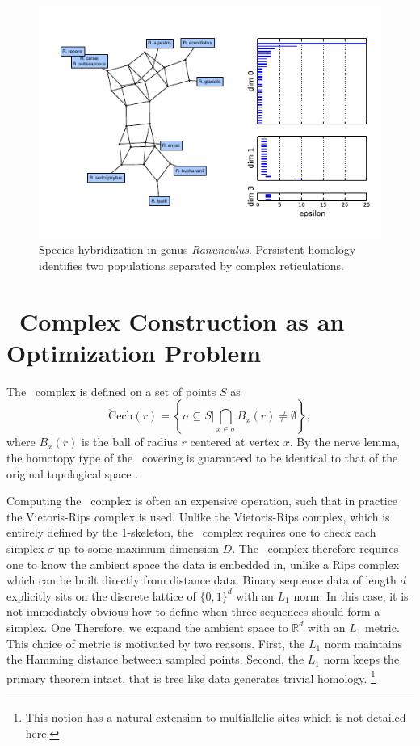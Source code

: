 \begin{figure}
\centering
\includegraphics[width=\columnwidth]{fig/complex_construction/buttercup.pdf}
\caption[Species hybridization in genus \emph{Ranunculus}]{Species hybridization in genus \emph{Ranunculus}. Persistent homology identifies two populations separated by complex reticulations.}
\label{fig:buttercup}
\end{figure}

\section{\Cech\ Complex Construction as an Optimization Problem}
\label{complex_construction:cech_complex}

The \Cech\ complex is defined on a set of points $S$ as
\begin{equation}
\mathrm{\check{C}ech}(r) = \left\{\sigma \subseteq S | \bigcap_{x\in\sigma} B_x(r) \neq \emptyset \right\},
\end{equation}
where $B_x(r)$ is the ball of radius $r$ centered at vertex $x$.
By the nerve lemma, the homotopy type of the \Cech\ covering is guaranteed to be identical to that of the original topological space \citep{Borsuk:1948}.

Computing the \Cech\ complex is often an expensive operation, such that in practice the Vietoris-Rips complex is used.
Unlike the Vietoris-Rips complex, which is entirely defined by the 1-skeleton, the \Cech\ complex requires one to check each simplex $\sigma$ up to some maximum dimension $D$.
The \Cech\ complex therefore requires one to know the ambient space the data is embedded in, unlike a Rips complex which can be built directly from distance data.
Binary sequence data of length $d$ explicitly sits on the discrete lattice of $\{0,1\}^d$ with an $L_1$ norm.
In this case, it is not immediately obvious how to define when three sequences should form a simplex.
One
Therefore, we expand the ambient space to $\mathbb{R}^d$ with an $L_1$ metric.
This choice of metric is motivated by two reasons.
First, the $L_1$ norm maintains the Hamming distance between sampled points.
Second, the $L_1$ norm keeps the primary theorem intact, that is tree like data generates trivial homology.
\footnote{This notion has a natural extension to multiallelic sites which is not detailed here.}

